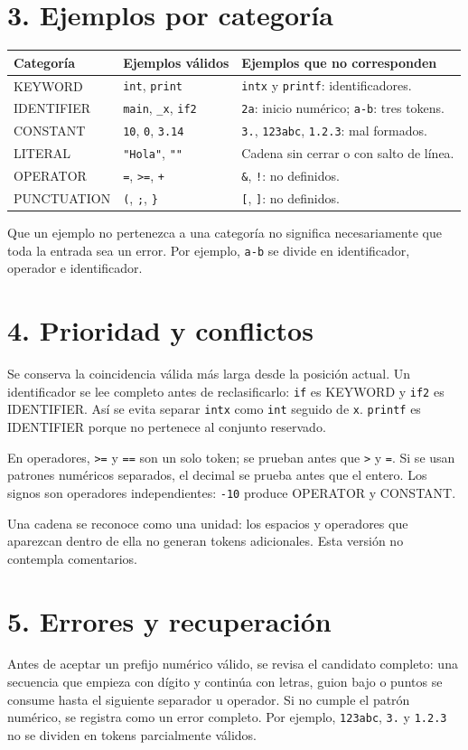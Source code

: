\documentclass[11pt,letterpaper]{article}
\newcommand{\tok}[1]{\texttt{#1}}
\begin{document}
\newpage
\section*{3. Ejemplos por categoría}
\begin{tabularx}{\textwidth}{@{}p{3cm}p{3.6cm}X@{}}
\toprule Categoría & Ejemplos válidos & Ejemplos que no corresponden\\\midrule
KEYWORD & \tok{int}, \tok{print} & \tok{intx} y \tok{printf}: identificadores.\\
IDENTIFIER & \tok{main}, \tok{\_x}, \tok{if2} & \tok{2a}: inicio numérico; \tok{a-b}: tres tokens.\\
CONSTANT & \tok{10}, \tok{0}, \tok{3.14} & \tok{3.}, \tok{123abc}, \tok{1.2.3}: mal formados.\\
LITERAL & \tok{"Hola"}, \tok{""} & Cadena sin cerrar o con salto de línea.\\
OPERATOR & \tok{=}, \tok{>=}, \tok{+} & \tok{\&}, \tok{!}: no definidos.\\
PUNCTUATION & \tok{(}, \tok{;}, \tok{\}} & \tok{[}, \tok{]}: no definidos.\\\bottomrule
\end{tabularx}
Que un ejemplo no pertenezca a una categoría no significa necesariamente que toda la entrada sea un error. Por ejemplo, \tok{a-b} se divide en identificador, operador e identificador.

\section*{4. Prioridad y conflictos}
Se conserva la coincidencia válida más larga desde la posición actual. Un identificador se lee completo antes de reclasificarlo: \tok{if} es KEYWORD y \tok{if2} es IDENTIFIER. Así se evita separar \tok{intx} como \tok{int} seguido de \tok{x}. \tok{printf} es IDENTIFIER porque no pertenece al conjunto reservado.

En operadores, \tok{>=} y \tok{==} son un solo token; se prueban antes que \tok{>} y \tok{=}. Si se usan patrones numéricos separados, el decimal se prueba antes que el entero. Los signos son operadores independientes: \tok{-10} produce OPERATOR y CONSTANT.

Una cadena se reconoce como una unidad: los espacios y operadores que aparezcan dentro de ella no generan tokens adicionales. Esta versión no contempla comentarios.

\section*{5. Errores y recuperación}
Antes de aceptar un prefijo numérico válido, se revisa el candidato completo: una secuencia que empieza con dígito y continúa con letras, guion bajo o puntos se consume hasta el siguiente separador u operador. Si no cumple el patrón numérico, se registra como un error completo. Por ejemplo, \tok{123abc}, \tok{3.} y \tok{1.2.3} no se dividen en tokens parcialmente válidos.
\end{document}
